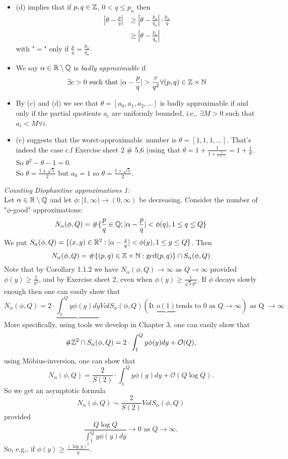 \documentclass[NumTh.tex]{subfiles}
\begin{document}
\begin{rem}
  \begin{itemize}
    \item (d) implies that if $p,q \in \mathbb{Z}$, $0 < q \leq p_n$ then
    \begin{align*}
      |\theta - \frac{p}{q}| &\geq |\theta - \frac{p_n}{q_n}| \cdot \frac{p_n}{q}\\
      &\geq | \theta - \frac{p_n}{q_n}|
    \end{align*}
    with "$=$" only if $\frac{p}{q} = \frac{p_n}{q_n}$.
    \item We say $\alpha \in \mathbb{R} \setminus \mathbb{Q}$ is \emph{badly approximable} if
    \[ \exists c > 0 \text{ such that } |\alpha - \frac{p}{q}| > \frac{c}{q^2} \forall (p,q) \in \mathbb{Z} \times \mathbb{N}\]
    \item By (c) and (d) we see that $\theta = [a_0,a_1,a_2,\dots]$ is badly approximable if and only if
    the partial quotients $a_i$ are uniformly bounded, i.e., $\exists M > 0$ such that $a_i < M \forall i$.
    \item (c) suggests that the \grqq worst-approximable\grqq ~number is $\theta = [1,1,1,\dots]$. 
    That's indeed the case c.f Exercise sheet 2 \# 5,6 (using that $\theta = 1 + \frac{1}{1+\frac{1}{1+\dots}} = 1 + \frac{1}{\theta}$.
    So $\theta^2 - \theta -1 = 0$.\\
    So $\theta = \frac{1 \pm \sqrt{5}}{2}$ but $a_0 = 1$ so $\theta = \frac{1 + \sqrt{5}}{2}$.
  \end{itemize}
\end{rem}

\emph{Counting Diophantine approximations 1:}\\
Let $\alpha \in \mathbb{R} \setminus \mathbb{Q}$ and let $\phi: [1,\infty) \to (0,\infty)$ be decreasing.
Consider the number of "$\phi$-good" approximations:
\[ N_\alpha(\phi,Q) = \#\{\frac{p}{q} \in \mathbb{Q} ; |\alpha - \frac{p}{q} | < \phi(q), 1 \leq q \leq Q\} \]
We put $S_\alpha(\phi,Q) = \{(x,y)\in \mathbb{R}^2 : | \alpha - \frac{x}{y}| < \phi(y), 1 \leq y \leq Q\}$.
Then
\[ N_\alpha(\phi,Q) = \#\{(p,q)\in \mathbb{Z} \times \mathbb{N} : \gcd(p,q)\} \cap S_\alpha(\phi,Q) \]
Note that by Corollary 1.1.2 we have $N_\alpha(\phi,Q) \to \infty$ as $Q \to \infty$ provided $\phi(y) \geq \frac{1}{y^2}$,
and by Exercise sheet 2, even when $\phi(y) \geq \frac{1}{\sqrt{5}y^2}$.
If $\phi$ decays slowly enough then one can easily show that
\[ N_\alpha(\phi,Q) = 2 \cdot \underbrace{\int_1^Q y \phi(y) dy}{Vol S_\alpha (\phi,Q)}(\text{It } \underbrace{o(1)}{\text{tends to } 0 \text{ as } Q \to \infty}) \text{ as Q } \to \infty \]
More specifically, using tools we develop in Chapter 3, one can easily show that
\[ \#\mathbb{Z}^2 \cap S_\alpha(\phi,Q) = 2 \cdot \int_1^Q y \phi(y) dy + \mathcal{O}(Q), \]
using Möbius-inversion, one can show that 
\[ N_\alpha(\phi,Q) = \frac{2}{S(2)} \cdot \int_1^Q y \phi(y) dy + \mathcal{O}(Q \log{Q}).\]
So we get an asymptotic formula
\[ N_\alpha (\phi,Q) \sim \frac{2}{S(2)} Vol S_\alpha (\phi,Q) \]
provided
\[ \frac{Q \log Q}{\int_1^Q y \phi(y)dy} \to 0 \text{ as } Q \to \infty. \]
So, e.g., if $\phi(y) \geq \frac{(\log y)^2}{y}$.
\end{document}
